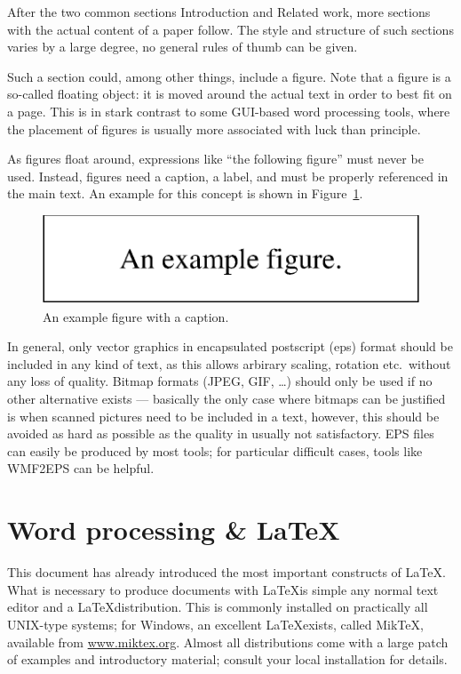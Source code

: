 \documentclass[12pt,twoside,doublepage]{article}
\begin{document}
After the two common sections Introduction and Related work, more
sections with the actual content of a paper follow. The style and
structure of such sections varies by a large degree, no general rules
of thumb can be given. 

Such a section could, among other things, include a figure. Note that
a figure is a so-called floating object: it is moved around the actual
text in order to best fit on a page. This is in stark contrast to some
GUI-based word processing tools, where the placement of figures is
usually more associated with luck than principle.

As figures float around, expressions like ``the following figure''
must never be used. Instead, figures need a caption, a label, and must
be properly referenced in the main text. An example for this concept
is shown in Figure~\ref{fig:example}. 

\begin{figure}[htbp]
  \begin{center}
    \includegraphics{example}
    \caption{An example figure with a caption.}
    \label{fig:example}
  \end{center}
\end{figure}

In general, only vector graphics in encapsulated postscript (eps)
format should be included in any kind of text, as this allows arbirary
scaling, rotation etc.\ without any loss of quality. Bitmap formats
(JPEG, GIF, \dots) should only be used if no other alternative exists
--- basically the only case where bitmaps can be justified is when
scanned pictures need to be included in a text, however, this should
be avoided as hard as possible as the quality in usually not
satisfactory. EPS files can easily be produced by most tools; for
particular difficult cases, tools like WMF2EPS can be helpful. 

\section{Word processing \& \LaTeX}
\label{sec:latex}

This document has already introduced the most important constructs of
\LaTeX. What is necessary to produce documents with \LaTeX is simple
any normal text editor and a \LaTeX distribution. This is commonly
installed on practically all UNIX-type systems; for Windows, an
excellent \LaTeX exists, called MikTeX, available from
\url{www.miktex.org}. Almost all distributions come with a large patch
of examples and introductory material; consult your local installation
for details. 
\end{document}
